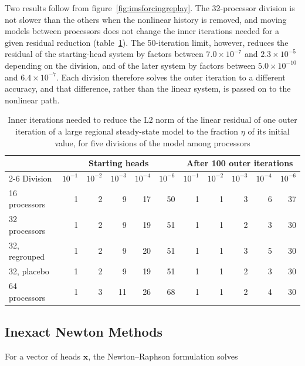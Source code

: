 Two results follow from figure~\ref{fig:imsforcingreplay}. The 32-processor division is not slower than the others when the nonlinear history is removed, and moving models between processors does not change the inner iterations needed for a given residual reduction (table~\ref{tab:imsforcingits}). The 50-iteration limit, however, reduces the residual of the starting-head system by factors between $7.0 \times 10^{-7}$ and $2.3 \times 10^{-5}$ depending on the division, and of the later system by factors between $5.0 \times 10^{-10}$ and $6.4 \times 10^{-7}$. Each division therefore solves the outer iteration to a different accuracy, and that difference, rather than the linear system, is passed on to the nonlinear path.

\begin{table}[!ht]
	\caption[Inner iterations needed to reduce the linear residual by a forcing term]{Inner iterations needed to reduce the L2 norm of the linear residual of one outer iteration of a large regional steady-state model to the fraction $\eta$ of its initial value, for five divisions of the model among processors}
	\label{tab:imsforcingits}
	\small
	\centering
	\begin{tabular}{l rrrrr rrrrr}
		\hline
		\hline
		& \multicolumn{5}{c}{Starting heads} & \multicolumn{5}{c}{After 100 outer iterations} \\
		\cline{2-6} \cline{7-11}
		Division & $10^{-1}$ & $10^{-2}$ & $10^{-3}$ & $10^{-4}$ & $10^{-6}$ & $10^{-1}$ & $10^{-2}$ & $10^{-3}$ & $10^{-4}$ & $10^{-6}$ \\
		\hline
		16 processors & 1 & 2 & 9 & 17 & 50 & 1 & 1 & 3 & 6 & 37 \\
		32 processors & 1 & 2 & 9 & 19 & 51 & 1 & 1 & 2 & 3 & 30 \\
		32, regrouped & 1 & 2 & 9 & 20 & 51 & 1 & 1 & 3 & 5 & 30 \\
		32, placebo & 1 & 2 & 9 & 19 & 51 & 1 & 1 & 2 & 3 & 30 \\
		64 processors & 1 & 3 & 11 & 26 & 68 & 1 & 1 & 2 & 4 & 30 \\
		\hline
	\end{tabular}
\end{table}

\subsection{Inexact Newton Methods}

For a vector of heads $\mathbf{x}$, the Newton--Raphson formulation solves

